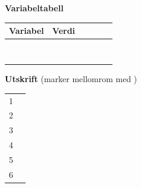 \bigskip
\textbf{Variabeltabell}\par
{\renewcommand{\arraystretch}{1.9}
\begin{tabular}{|p{2.6cm}|p{2.4cm}|p{2.4cm}|p{2.4cm}|p{2.4cm}|p{2.4cm}|}\hline
\rowcolor{frodeblue!8}\textbf{Variabel} & \textbf{Verdi} & & & & \\ \hline
& & & & & \\ \hline
& & & & & \\ \hline
& & & & & \\ \hline
& & & & & \\ \hline
& & & & & \\ \hline
& & & & & \\ \hline
& & & & & \\ \hline
& & & & & \\ \hline
\end{tabular}}

\bigskip
\textbf{Utskrift} (marker mellomrom med \textvisiblespace)\par
{\renewcommand{\arraystretch}{2.0}
\begin{tabular}{p{0.6cm}p{15.0cm}}
1 & \hrulefill \\ 2 & \hrulefill \\ 3 & \hrulefill \\ 4 & \hrulefill \\ 5 & \hrulefill \\ 6 & \hrulefill \\
\end{tabular}}
